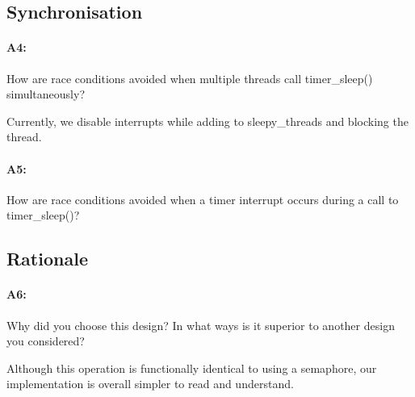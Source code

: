 \documentclass[11pt]{article}
\begin{document}
\subsection{Synchronisation}
\paragraph{A4:}
How are race conditions avoided when multiple threads call timer\_sleep() simultaneously?

Currently, we disable interrupts while adding to sleepy\_threads and blocking the thread.

\paragraph{A5:}
How are race conditions avoided when a timer interrupt occurs during a call to timer\_sleep()?

\subsection{Rationale}
\paragraph{A6:}
Why did you choose this design? In what ways is it superior to another design you considered?

Although this operation is functionally identical to using a semaphore, our implementation is overall simpler to read and understand.
\end{document}
